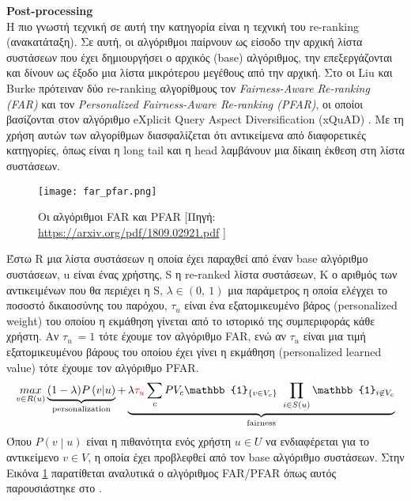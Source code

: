 \noindent \textbf{Post-processing}\\
Η πιο γνωστή τεχνική σε αυτή την κατηγορία είναι η τεχνική του re-ranking (ανακατάταξη). Σε αυτή, οι αλγόριθμοι παίρνουν ως είσοδο την αρχική λίστα συστάσεων που έχει δημιουργήσει ο αρχικός (base) αλγόριθμος, την επεξεργάζονται και δίνουν ως έξοδο μια λίστα μικρότερου μεγέθους από την αρχική.
Στο \cite{liuPersonalizingFairnessawareReranking2018} οι Liu και Burke πρότειναν δύο re-ranking αλγορίθμους τον \textit{Fairness-Aware Re-ranking (FAR)} και τον \textit{Personalized Fairness-Aware Re-ranking (PFAR)}, οι οποίοι βασίζονται στον αλγόριθμο eXplicit Query
Aspect Diversification (xQuAD) \cite{santosExploitingQueryReformulations2010}. Με τη χρήση αυτών των αλγορίθμων διασφαλίζεται ότι αντικείμενα από διαφορετικές κατηγορίες, όπως είναι η long tail και η head λαμβάνουν μια δίκαιη έκθεση στη λίστα συστάσεων.
\begin{figure}[!htb]
	\centering
	\texttt{[image: far\_pfar.png]}
	\caption[Οι αλγόριθμοι FAR και PFAR] {Οι αλγόριθμοι FAR και PFAR [Πηγή: \url{https://arxiv.org/pdf/1809.02921.pdf}
		]}
	\label{fig:far_pfar}
\end{figure}
 Έστω R μια λίστα συστάσεων η οποία έχει παραχθεί από έναν base αλγόριθμο συστάσεων, u είναι ένας χρήστης, S η re-ranked λίστα συστάσεων, K ο αριθμός των αντικειμένων που θα περιέχει η S, $ \lambda\in\left(0,\ 1\right) $ μια παράμετρος η οποία ελέγχει το ποσοστό δικαιοσύνης του παρόχου, $  \tau_u $ είναι ένα εξατομικευμένο βάρος (personalized weight) του οποίου η εκμάθηση γίνεται από το ιστορικό της συμπεριφοράς κάθε χρήστη. Αν $ \tau_u\ = 1 $ τότε έχουμε τον αλγόριθμο FAR, ενώ αν $ \tau_u $ είναι μια τιμή εξατομικευμένου βάρους του οποίου έχει γίνει η εκμάθηση (personalized learned value) τότε έχουμε τον αλγόριθμο PFAR.
\begin{align*}
 \underset{\substack {v\in R(u)}}{max}\underbrace { (1-\lambda) P\left(v\middle| u\right)}_{\text {personalization}} + \underbrace{\lambda \textcolor{red}{\tau_u} \sum_c{PV_c} \mathbb{1}_{\left\{v\in V_c\right\}}\ \prod_{i\in S(u)}\mathbb{1}_{i\not\in V_c}} _{\text {fairness}}
\end{align*}
Όπου $ P\left(v\middle| u\right)  $ είναι η πιθανότητα ενός χρήστη $  u\in U $ να ενδιαφέρεται για το αντικείμενο $ v\in V $, η οποία έχει προβλεφθεί από τον base αλγόριθμο συστάσεων. Στην Εικόνα \ref{fig:far_pfar} παρατίθεται αναλυτικά ο αλγόριθμος FAR/PFAR όπως αυτός παρουσιάστηκε στο \cite{liuPersonalizingFairnessawareReranking2018}.\\
